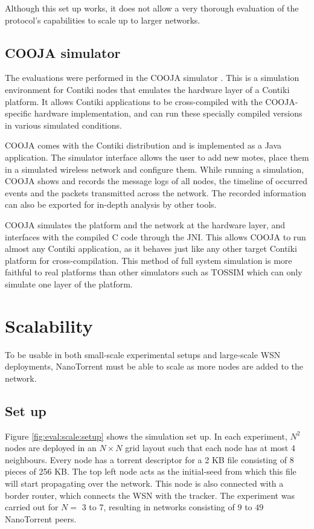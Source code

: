 Although this set up works, it does not allow a very thorough evaluation of the protocol's capabilities to scale up to larger networks.

\subsection{COOJA simulator}
The evaluations were performed in the COOJA simulator \cite{cooja}. This is a simulation environment for Contiki nodes that emulates the hardware layer of a Contiki platform. It allows Contiki applications to be cross-compiled with the COOJA-specific hardware implementation, and can run these specially compiled versions in various simulated conditions.

COOJA comes with the Contiki distribution and is implemented as a Java application. The simulator interface allows the user to add new motes, place them in a simulated wireless network and configure them. While running a simulation, COOJA shows and records the message logs of all nodes, the timeline of occurred events and the packets transmitted across the network. The recorded information can also be exported for in-depth analysis by other tools.

COOJA simulates the platform and the network at the hardware layer, and interfaces with the compiled C code through the \gls{JNI}. This allows COOJA to run almost any Contiki application, as it behaves just like any other target Contiki platform for cross-compilation. This method of full system simulation is more faithful to real platforms than other simulators such as TOSSIM \cite{tossim} which can only simulate one layer of the platform.

\section{Scalability}
\label{sec:eval:scale}
To be usable in both small-scale experimental setups and large-scale \gls{WSN} deployments, NanoTorrent must be able to scale as more nodes are added to the network.

\subsection{Set up}
Figure \ref{fig:eval:scale:setup} shows the simulation set up. In each experiment, $N^2$ nodes are deployed in an $N \times N$ grid layout such that each node has at most 4 neighbours. Every node has a torrent descriptor for a 2 \gls{KB} file consisting of 8 pieces of 256 \gls{KB}. The top left node acts as the \gls{initial-seed} from which this file will start propagating over the network. This node is also connected with a border router, which connects the \gls{WSN} with the \gls{tracker}. The experiment was carried out for $N =$ 3 to 7, resulting in networks consisting of $9$ to $49$ NanoTorrent peers.

